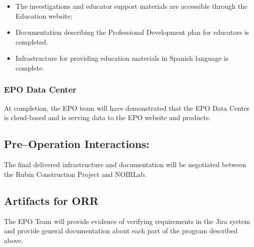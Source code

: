 \begin{itemize}
	\item The investigations and educator support materials are accessible through the Education website;
	\item Documentation describing the Professional Development plan for educators is completed.
	\item Infrastructure for providing education materials in Spanish language is complete. 
\end{itemize}

\subsubsection{EPO Data Center}

At completion, the EPO team will have demonstrated that the EPO Data Center is cloud-based and is serving data to the EPO website and products. 

\subsection{Pre--Operation Interactions:}

The final delivered infrastructure and documentation will be negotiated between the Rubin Construction Project and NOIRLab.

\subsection{Artifacts for ORR}

The EPO Team will provide evidence of verifying requirements in the Jira system and provide general documentation about each part of the program described above. 

	
